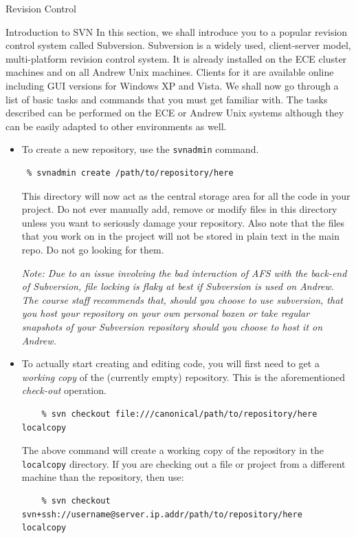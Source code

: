 \documentclass{article}
\begin{document}
\begin{section}{Revision Control}
	\begin{subsection}{Introduction to SVN} \label{revision} In
	this section, we shall introduce you to a popular revision
	control system called Subversion.  Subversion is a widely
	used, client-server model, multi-platform revision control
	system.  It is already installed on the ECE cluster machines
	and on all Andrew Unix machines.  Clients for it are available
	online~\cite{CollabNet:Subversion} including GUI versions for
	Windows XP and Vista.  We shall now go through a list of basic
	tasks and commands that you must get familiar with.  The tasks
	described can be performed on the ECE or Andrew Unix systems
	although they can be easily adapted to other environments as
	well.

	\begin{itemize} \item To create a new repository, use the
	\texttt{svnadmin} command.  
	\begin{verbatim} % svnadmin create /path/to/repository/here 
	\end{verbatim} 
	This directory will
	now act as the central storage area for all the code in your
	project.  Do not ever manually add, remove or modify files in
	this directory unless you want to seriously damage your
	repository.  Also note that the files that you work on in the
	project will not be stored in plain text in the main repo.  Do
	not go looking for them.

	\emph{Note: Due to an issue involving the bad interaction of
	AFS with the back-end of Subversion, file locking is flaky at
	best if Subversion is used on Andrew.  The course staff
	recommends that, should you choose to use subversion, that you
	host your repository on your own personal boxen or take
	regular snapshots of your Subversion repository should you
	choose to host it on Andrew.}

	\item To actually start creating and editing code, you will
	first need to get a \emph{working copy} of the (currently
	empty) repository.  This is the aforementioned
	\emph{check-out} operation.  
	\begin{verbatim} 
	% svn checkout file:///canonical/path/to/repository/here localcopy
	\end{verbatim} 
	The above command will create a working copy of
	the repository in the \texttt{localcopy} directory.  If you
	are checking out a file or project from a different machine
	than the repository, then use: 
	\begin{verbatim} 
	% svn checkout svn+ssh://username@server.ip.addr/path/to/repository/here  localcopy 
	\end{verbatim}


\end{itemize}
\end{subsection}
\end{section}
\end{document}
